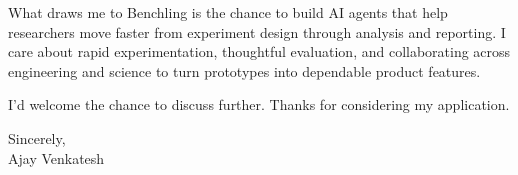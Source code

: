 \documentclass[letterpaper,11pt]{article}
\begin{document}
What draws me to Benchling is the chance to build AI agents that help researchers move faster from experiment design through analysis and reporting. I care about rapid experimentation, thoughtful evaluation, and collaborating across engineering and science to turn prototypes into dependable product features.

I'd welcome the chance to discuss further. Thanks for considering my application.

\vspace{12pt}
Sincerely, \\
Ajay Venkatesh
\end{document}
